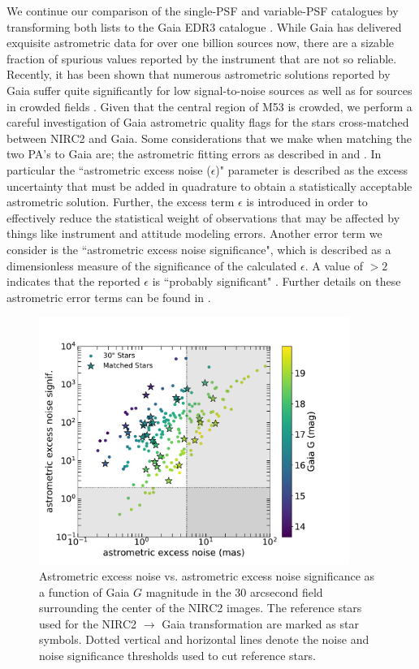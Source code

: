 \documentclass[]{spie}  %
\begin{document}
\indent We continue our comparison of the single-PSF and variable-PSF catalogues by transforming both lists to the Gaia EDR3 catalogue \cite{brown:2021a}. While Gaia has delivered exquisite astrometric data for over one billion sources now, there are a sizable fraction of spurious values reported by the instrument that are not so reliable. Recently, it has been shown that numerous astrometric solutions reported by Gaia suffer quite significantly for low signal-to-noise sources as well as for sources in crowded fields \cite{rybizki:2022a}. Given that the central region of M53 is crowded, we perform a careful investigation of Gaia astrometric quality flags for the stars cross-matched between NIRC2 and Gaia. Some considerations that we make when matching the two PA's to Gaia are; the astrometric fitting errors as described in \cite{brown:2021a} and \cite{brown:2018a}. In particular the ``astrometric excess noise ($\epsilon$)" parameter is described as the excess uncertainty that must be added in quadrature to obtain a statistically acceptable astrometric solution. Further, the excess term $\epsilon$ is introduced in order to effectively reduce the statistical weight of observations that may be affected by things like instrument and attitude modeling errors. Another error term we consider is the ``astrometric excess noise significance", which is described as a dimensionless measure of the significance of the calculated $\epsilon$. A value of $> 2$ indicates that the reported $\epsilon$ is ``probably significant" \cite{lindegren:2012a}. Further details on these astrometric error terms can be found in \cite{lindegren:2012a}.
\\
\begin{figure}[!h]
 \centering
 \includegraphics[width=0.9\textwidth]{airopa/Figures/M53_aen.pdf}
 \caption{\footnotesize Astrometric excess noise vs. astrometric excess noise significance as a function of Gaia $G$ magnitude in the 30 arcsecond field surrounding the center of the NIRC2 images. The reference stars used for the NIRC2 $\rightarrow$ Gaia transformation are marked as star symbols. Dotted vertical and horizontal lines denote the noise and noise significance thresholds used to cut reference stars.\label{fig:m53_aen}}
\end{figure}
\end{document}
